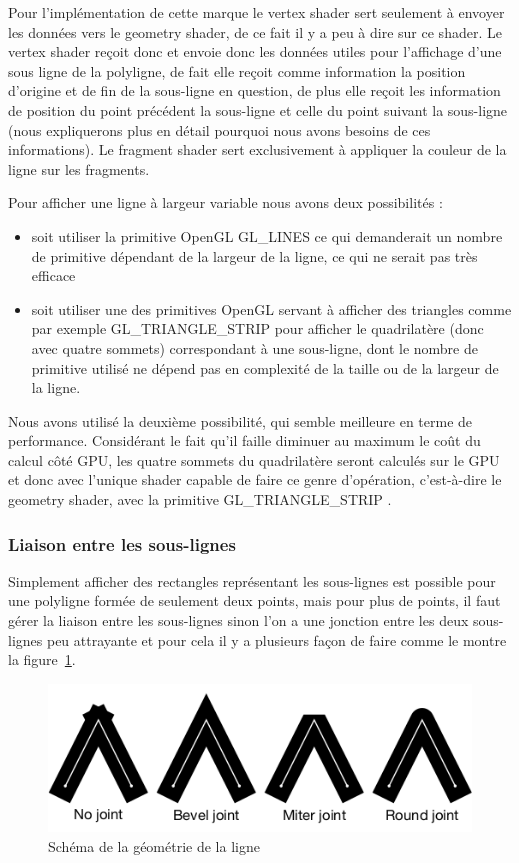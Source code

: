 \documentclass[12pt]{article}
\begin{document}
Pour l’implémentation de cette marque le vertex shader sert seulement à envoyer
 les données vers le geometry shader, de ce fait il y a peu à dire sur ce shader.
 Le vertex shader reçoit donc et envoie donc les données utiles pour l’affichage
 d’une sous ligne de la polyligne, de fait elle reçoit comme information la position
 d’origine et de fin de la sous-ligne en question, de plus elle reçoit les information
 de position du point précédent la sous-ligne et celle du point suivant la sous-ligne
 (nous expliquerons plus en détail pourquoi nous avons besoins de ces informations).
 Le fragment shader sert exclusivement à appliquer la couleur de la ligne sur les fragments.

Pour afficher une ligne à largeur variable nous avons deux possibilités :
\begin{itemize}
\item soit utiliser la primitive OpenGL \og GL\_LINES \fg{} ce qui demanderait un nombre de primitive dépendant de la largeur de la ligne, ce qui ne serait pas très efficace
\item soit utiliser une des primitives OpenGL servant à afficher des triangles comme par exemple \og GL\_TRIANGLE\_STRIP \fg{} pour afficher le quadrilatère (donc avec quatre sommets) correspondant à une sous-ligne, dont le nombre de primitive utilisé ne dépend pas en complexité de la taille ou de la largeur de la ligne.
\end{itemize}

Nous avons utilisé la deuxième possibilité, qui semble meilleure en terme de performance.
Considérant le fait qu’il faille diminuer au maximum le coût du calcul côté GPU, les quatre sommets du quadrilatère seront calculés sur le GPU et donc avec l’unique shader capable de faire ce genre d’opératio­n, c’est-à-dire le geometry shader, avec la primitive \og GL\_TRIANGLE\_STRIP \fg{}.

\subsubsection{Liaison entre les sous-lignes}
Simplement afficher des rectangles représentant les sous-lignes est possible pour une polyligne formée de seulement deux points, mais pour plus de points, il faut gérer la liaison entre les sous-lignes sinon l'on a une jonction entre les deux sous-lignes peu attrayante et pour cela il y a plusieurs façon de faire comme le montre la figure~\ref{fig:joint}.

\begin{figure}[htp]
  \centering
  \includegraphics[scale=0.8]{images/line-joints}
  \caption{Schéma de la géométrie de la ligne}
  \label{fig:joint}
\end{figure}
\end{document}
